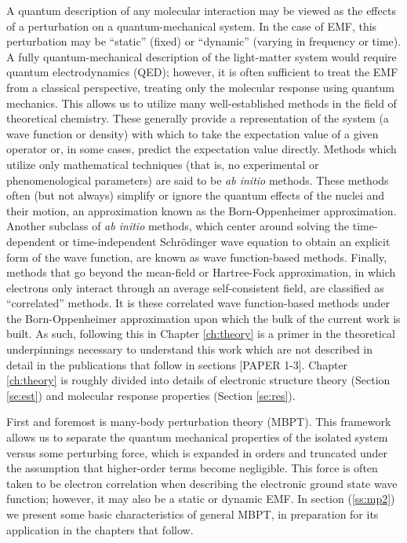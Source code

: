 A quantum description of any molecular interaction may be viewed as the effects of a perturbation
on a quantum-mechanical system. In the case of EMF, this perturbation may be ``static'' (fixed)
or ``dynamic'' (varying in frequency or time). A fully quantum-mechanical description of the 
light-matter system would require quantum electrodynamics (QED); however, it is often sufficient
to treat the EMF from a classical perspective, treating only the molecular response using
quantum mechanics. This allows us to utilize many well-established methods in the field of 
theoretical chemistry. These generally provide a representation of the system (a wave function or 
density) with which to take the expectation value of a given operator or, in some cases, predict 
the expectation value directly. Methods which utilize only mathematical techniques (that is, no
experimental or phenomenological parameters) are said to be \textit{ab initio} methods. These 
methods often (but not always) simplify or ignore the quantum effects of the nuclei and their 
motion, an approximation known as the Born-Oppenheimer approximation. 
Another subclass of \textit{ab initio} methods, which 
center around solving the time-dependent or time-independent Schr\"odinger wave equation to 
obtain an explicit form of the wave function, are 
known as wave function-based methods. Finally, methods that go beyond the mean-field or Hartree-Fock 
approximation, in which electrons only interact through an average self-consistent field, are 
classified as ``correlated'' methods. 
It is these correlated wave function-based methods under the Born-Oppenheimer
approximation upon which the bulk of the current work is built. As such, following this in Chapter 
\ref{ch:theory} is a primer in the theoretical underpinnings necessary to understand this work which are not described 
in detail in the publications that follow in sections [PAPER 1-3]. Chapter \ref{ch:theory} is roughly 
divided into details of electronic structure theory (Section \ref{se:est}) and molecular response 
properties (Section \ref{se:res}). 

First and foremost is many-body perturbation theory (MBPT). This framework allows us to 
separate the quantum mechanical properties of the isolated system versus some perturbing 
force, which is expanded in orders and truncated under the assumption that higher-order terms 
become negligible.
This force is often taken to be electron correlation when describing the electronic ground 
state wave function; however, it may also be a static or dynamic EMF. In section (\ref{ss:mp2})
we present some basic characteristics of general MBPT, in preparation for its application in the 
chapters that follow.

